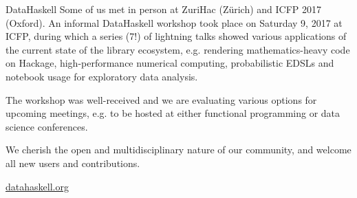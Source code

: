 \documentclass[DIV16,twocolumn,10pt]{scrreprt}
\begin{document}
\begin{hcarentry}{DataHaskell}
Some of us met in person at ZuriHac (Z\"{u}rich) and ICFP 2017 (Oxford). An informal DataHaskell workshop took place on Saturday 9, 2017 at ICFP, during which a series (7!) of lightning talks showed various applications of the current state of the library ecosystem, e.g. rendering mathematics-heavy code on Hackage, high-performance numerical computing, probabilistic EDSLs and notebook usage for exploratory data analysis. 

The workshop was well-received and we are evaluating various options for upcoming meetings, e.g. to be hosted at either functional programming or data science conferences.



We cherish the open and multidisciplinary nature of our community, and welcome all new users and contributions.

\FurtherReading
  \url{datahaskell.org}
\end{hcarentry}
\end{document}
